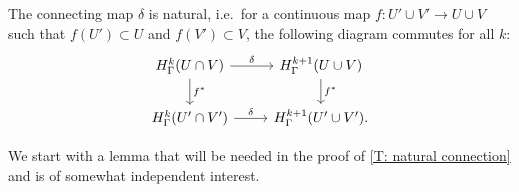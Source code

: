 \begin{theorem}\label{T: natural connection}
	The connecting map $\delta$ is natural, i.e.\ for a continuous map $f \colon U' \cup V' \to U \cup V$ such that $f(U') \subset U$ and $f(V') \subset V$, the following diagram commutes for all $k$:
	\[
	\begin{tikzcd}
		H^k_\Gamma(U \cap V) \arrow[r, "\delta"] \arrow[d, "f^*"] & H^{k+1}_\Gamma(U \cup V) \arrow[d, "f^*"] \\
		H^k_\Gamma(U' \cap V') \arrow[r, "\delta"] & H^{k+1}_\Gamma(U' \cup V').
	\end{tikzcd}
	\]
\end{theorem}

We start with a lemma that will be needed in the proof of \cref{T: natural connection} and is of somewhat independent interest.

